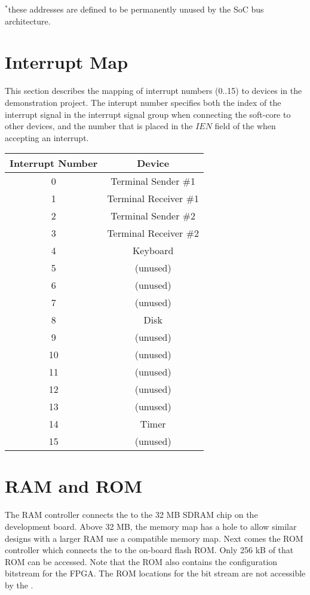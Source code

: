 $^*$these addresses are defined to be permanently unused by the SoC bus architecture.

\section{Interrupt Map}

This section describes the mapping of interrupt numbers (0..15) to devices in the demonstration project. The interupt number specifies both the index of the interrupt signal in the interrupt signal group when connecting the soft-core to other devices, and the number that is placed in the $IEN$ field of the \psw when accepting an interrupt.

\begin{tabular}{|c|c|}
\hline
Interrupt Number & Device\\
\hline
0 & Terminal Sender \#1\\
1 & Terminal Receiver \#1\\
2 & Terminal Sender \#2\\
3 & Terminal Receiver \#2\\
4 & Keyboard\\
5 & (unused)\\
6 & (unused)\\
7 & (unused)\\
8 & Disk\\
9 & (unused)\\
10 & (unused)\\
11 & (unused)\\
12 & (unused)\\
13 & (unused)\\
14 & Timer\\
15 & (unused)\\
\hline
\end{tabular}

\section{RAM and ROM}

The RAM controller connects the \eco to the 32 MB SDRAM chip on the development board. Above 32 MB, the memory map has a hole to allow similar designs with a larger RAM use a compatible memory map. Next comes the ROM controller which connects the \eco to the on-board flash ROM. Only 256 kB of that ROM can be accessed. Note that the ROM also contains the configuration bitstream for the FPGA. The ROM locations for the bit stream are not accessible by the \ecox.

